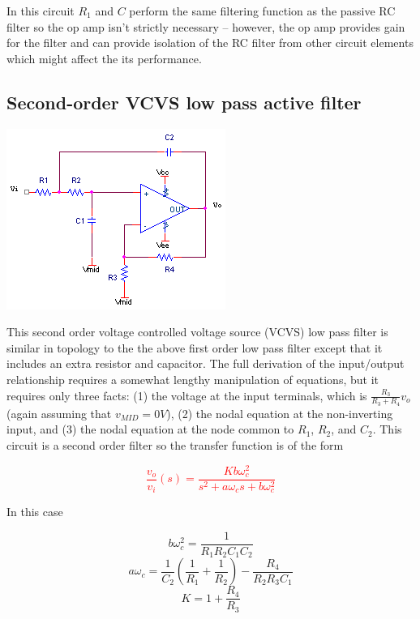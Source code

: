 In this circuit $R_1$ and $C$ perform the same filtering function as the passive RC filter so the op amp isn't strictly necessary -- however, the op amp provides gain for the filter and can provide isolation of the RC filter from other circuit elements which might affect the its performance.

\subsection{Second-order VCVS low pass active filter}
\begin{center}
	\includegraphics{schematics/2ndorder_vcvs_LPfilter.PNG}
\end{center}
This second order voltage controlled voltage source (VCVS) low pass filter is similar in topology to the the above first order low pass filter except that it includes an extra resistor and capacitor. The full derivation of the input/output relationship requires a somewhat lengthy manipulation of equations, but it requires only three facts: (1) the voltage at the input terminals, which is $\frac{R_{3}}{R_{3}+R_{4}}v_{o}$ (again assuming that $v_{MID} = 0V$), (2) the nodal equation at the non-inverting input, and (3) the nodal equation at the node common to $R_{1}$, $R_{2}$, and $C_{2}$. This circuit is a second order filter so the transfer function is of the form

\textcolor{red}{
\begin{equation}
\frac{v_{o}}{v_{i}}(s) = \frac{Kb\omega_{c}^{2}}{s^{2} + a\omega_{c}s + b\omega_{c}^{2}}
\label{eq:2ndorder_vcvs_LPfilter}
\end{equation}
}

In this case

\begin{equation}
b\omega_{c}^{2} = \frac{1}{R_{1}R_{2}C_{1}C_{2}}
\end{equation}
\begin{equation}
a\omega_{c} = \frac{1}{C_{2}}\left(\frac{1}{R_{1}} + \frac{1}{R_{2}}\right) - \frac{R_{4}}{R_{2}R_{3}C_{1}}
\end{equation}
\begin{equation}
K = 1 + \frac{R_{4}}{R_{3}}
\end{equation}

